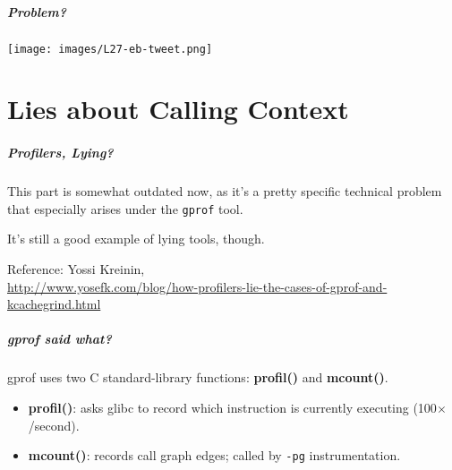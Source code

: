 \begin{frame}
\frametitle{Problem?}

\begin{center}
\texttt{[image: images/L27-eb-tweet.png]}
\end{center}


\end{frame}



\part{Lies about Calling Context}

\begin{frame}
  \partpage
\end{frame}


\begin{frame}
\frametitle{Profilers, Lying?}

This part is somewhat outdated now, as it's a pretty specific technical problem that especially arises under the {\tt gprof} tool. 

It's still a good example of lying tools, though.

  \begin{center}
    Reference: Yossi Kreinin,\\
  \scriptsize
  \url{http://www.yosefk.com/blog/how-profilers-lie-the-cases-of-gprof-and-kcachegrind.html}
  \end{center}

\end{frame}

\begin{frame}
\frametitle{gprof said what?}

gprof uses two C standard-library functions: {\bf profil()} and {\bf mcount()}.

\begin{itemize}
\item {\bf profil()}: asks glibc to record which instruction 
  is currently executing (100$\times$/second).
\item {\bf mcount()}: records call graph edges; called by {\tt -pg} instrumentation.
\end{itemize}


  
\end{frame}

